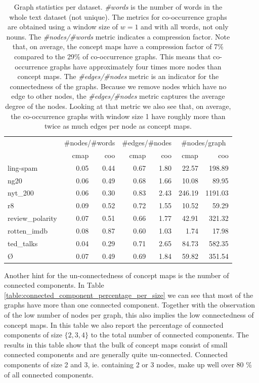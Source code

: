 \begin{table}[htb!]
	\centering
	\begin{tabular}{lrrrrrr}
		{} &  \multicolumn{2}{c}{\#nodes/\#words} &  \multicolumn{2}{c}{\#edges/\#nodes} & \multicolumn{2}{c}{\#nodes/graph} \\
		{} & cmap &  coo & cmap & coo & cmap & coo\\
		\midrule
ling-spam       & 0.05 & 0.44 & 0.67 & 1.80 & 22.57 & 198.89 \\
ng20            & 0.06 & 0.49 & 0.68 & 1.66 & 10.08 & 89.95 \\
nyt\_200         & 0.06 & 0.30 & 0.83 & 2.43 & 246.19 & 1191.03 \\
r8              & 0.09 & 0.52 & 0.72 & 1.55 & 10.52 & 59.29 \\
review\_polarity & 0.07 & 0.51 & 0.66 & 1.77 & 42.91 & 321.32 \\
rotten\_imdb     & 0.08 & 0.87 & 0.60 & 1.03 & 1.74 & 17.98 \\
ted\_talks       & 0.04 & 0.29 & 0.71 & 2.65 & 84.73 & 582.35 \\
			\midrule
			\O{}            & 0.07 & 0.49 & 0.69 & 1.84 & 59.82 & 351.54 \\
			\bottomrule
	\end{tabular}	
	\caption[Statistics: Graphs]{Graph statistics per dataset. \textit{\#words} is the number of words in the whole text dataset (not unique). The metrics for co-occurrence graphs are obtained using a window size of $w=1$ and with all words, not only nouns. The \textit{\#nodes/\#words} metric indicates a compression factor. Note that, on average, the concept maps have a compression factor of 7\% compared to the 29\% of co-occurrence graphs. This means that co-occurrence graphs have approximately four times more nodes than concept maps. The \textit{\#edges/\#nodes} metric is an indicator for the connectedness of the graphs. Because we remove nodes which have no edge to other nodes, the \textit{\#edges/\#nodes} metric captures the average degree of the nodes. Looking at that metric we also see that, on average, the co-occurrence graphs with window size 1 have roughly more than twice as much edges per node as concept maps.}\label{table:graph_statistics}
\end{table}

Another hint for the un-connectedness of concept maps is the number of connected components.
In Table \ref{table:connected_component_percentage_per_size} we can see that most of the graphs have more than one connected component. Together with the observation of the low number of nodes per graph, this also implies the low connectedness of concept maps.
In this table we also report the percentage of connected components of size $\{2,3,4\}$ to the total number of connected components.
The results in this table show that the bulk of concept maps consist of small connected components and are generally quite un-connected. Connected components of size 2 and 3, ie. containing 2 or 3 nodes, make up well over 80 \% of all connected components.

